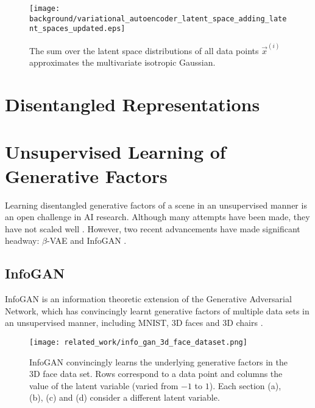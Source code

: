 \begin{landscape}
\begin{figure}[h!]
\centering
\captionsetup{justification=centering}
\texttt{[image: background/variational\_autoencoder\_latent\_space\_adding\_latent\_spaces\_updated.eps]}
\caption{\vspace*{-20mm}The sum over the latent space distributions of all data points $\vec{x}^{(i)}$ approximates the multivariate isotropic Gaussian. \cite{Dykeman2016}}
\label{fig:variational_autoencoder_latent_space_adding_latent_spaces_updated}
\end{figure}
\end{landscape}



%
%
%
%
%
\section{Disentangled Representations}
\cite{Higgins2016, Thiagarajan2016}





%
%
%
%
%
\section{Unsupervised Learning of Generative Factors}
Learning disentangled generative factors of a scene in an unsupervised manner is an open challenge in AI research. Although many attempts have been made, they have not scaled well \cite{Thiagarajan2016, Schmidhuber1992, Desjardins2012, Tang2013, Cohen2014}. However, two recent advancements have made significant headway: $\beta$-VAE and InfoGAN \cite{Chen2016, Thiagarajan2016}.

\subsection{InfoGAN}
InfoGAN is an information theoretic extension of the Generative Adversarial Network, which has convincingly learnt generative factors of multiple data sets in an unsupervised manner, including MNIST, 3D faces and 3D chairs \cite{Chen2016}.

\begin{figure}[h!]
\centering
\captionsetup{justification=centering}
\texttt{[image: related\_work/info\_gan\_3d\_face\_dataset.png]}
\caption{InfoGAN convincingly learns the underlying generative factors in the 3D face data set. Rows correspond to a data point and columns the value of the latent variable (varied from $-1$ to $1$). Each section (a), (b), (c) and (d) consider a different latent variable. \cite{Chen2016}}
\label{fig:info_gan_3d_face_dataset}
\end{figure}


